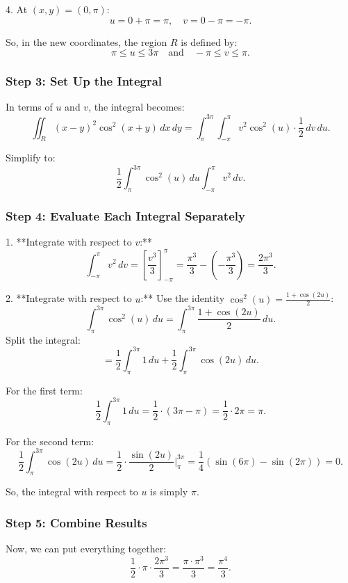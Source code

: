 \documentclass{article}
\begin{document}
4. At \( (x, y) = (0, \pi) \):
   \[
   u = 0 + \pi = \pi, \quad v = 0 - \pi = -\pi.
   \]

So, in the new coordinates, the region \( R \) is defined by:
\[
\pi \leq u \leq 3\pi \quad \text{and} \quad -\pi \leq v \leq \pi.
\]

\subsubsection*{Step 3: Set Up the Integral}
In terms of \( u \) and \( v \), the integral becomes:
\[
\iint_R (x - y)^2 \cos^2(x + y) \, dx \, dy = \int_{\pi}^{3\pi} \int_{-\pi}^{\pi} v^2 \cos^2(u) \cdot \frac{1}{2} \, dv \, du.
\]

Simplify to:
\[
\frac{1}{2} \int_{\pi}^{3\pi} \cos^2(u) \, du \int_{-\pi}^{\pi} v^2 \, dv.
\]

\subsubsection*{Step 4: Evaluate Each Integral Separately}
1. **Integrate with respect to \( v \):**
   \[
   \int_{-\pi}^{\pi} v^2 \, dv = \left[ \frac{v^3}{3} \right]_{-\pi}^{\pi} = \frac{\pi^3}{3} - \left(-\frac{\pi^3}{3}\right) = \frac{2\pi^3}{3}.
   \]

2. **Integrate with respect to \( u \):**
   Use the identity \( \cos^2(u) = \frac{1 + \cos(2u)}{2} \):
   \[
   \int_{\pi}^{3\pi} \cos^2(u) \, du = \int_{\pi}^{3\pi} \frac{1 + \cos(2u)}{2} \, du.
   \]
   Split the integral:
   \[
   = \frac{1}{2} \int_{\pi}^{3\pi} 1 \, du + \frac{1}{2} \int_{\pi}^{3\pi} \cos(2u) \, du.
   \]

   For the first term:
   \[
   \frac{1}{2} \int_{\pi}^{3\pi} 1 \, du = \frac{1}{2} \cdot (3\pi - \pi) = \frac{1}{2} \cdot 2\pi = \pi.
   \]

   For the second term:
   \[
   \frac{1}{2} \int_{\pi}^{3\pi} \cos(2u) \, du = \frac{1}{2} \cdot \frac{\sin(2u)}{2} \Big|_{\pi}^{3\pi} = \frac{1}{4} \left( \sin(6\pi) - \sin(2\pi) \right) = 0.
   \]

   So, the integral with respect to \( u \) is simply \( \pi \).

\subsubsection*{Step 5: Combine Results}
Now, we can put everything together:
\[
\frac{1}{2} \cdot \pi \cdot \frac{2\pi^3}{3} = \frac{\pi \cdot \pi^3}{3} = \frac{\pi^4}{3}.
\]
\end{document}
